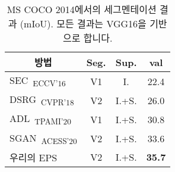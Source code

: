 \begin{table}[]
\centering
{\small
\begin{tabular}{@{}lccc@{}}
\toprule
\multicolumn{1}{c}{방법}                                                  &Seg.       &Sup.   & \multicolumn{1}{c}{val}           \\ \midrule
\multicolumn{1}{l}{SEC~\cite{kolesnikov2016seed}\textsubscript{ECCV'16}}    & V1        &I.     & \multicolumn{1}{c}{22.4}          \\
\multicolumn{1}{l}{DSRG~\cite{huang2018weakly}\textsubscript{CVPR'18}}      & V2        &I.+S.  & \multicolumn{1}{c}{26.0}          \\
\multicolumn{1}{l}{ADL~\cite{choe2020attention}\textsubscript{TPAMI'20}}    & V1        &I.+S.  & \multicolumn{1}{c}{30.8}          \\
\multicolumn{1}{l}{SGAN~\cite{yao2020saliency}\textsubscript{ACESS'20}}     & V2        &I.+S.  & \multicolumn{1}{c}{33.6}          \\ \midrule
\multicolumn{1}{l}{우리의 EPS}                                                 & V2        &I.+S.  & \multicolumn{1}{c}{\textbf{35.7}} \\ \bottomrule
\end{tabular}
}
\vspace{2mm}
\caption{MS COCO 2014에서의 세그멘테이션 결과 (mIoU). 모든 결과는 VGG16을 기반으로 합니다.}\vspace{-2mm}
\label{tab:seg_quantitative_coco}
\end{table}
